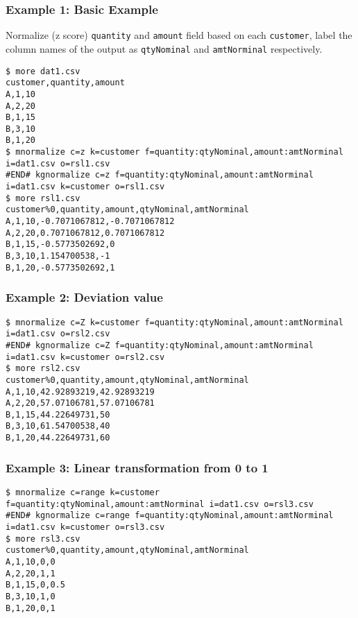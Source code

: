 \subsubsection*{Example 1: Basic Example}

Normalize (z score) \verb|quantity| and \verb|amount| field based on each \verb|customer|, label the column names of the output as \verb|qtyNominal| and \verb|amtNorminal| respectively.


\begin{Verbatim}[baselinestretch=0.7,frame=single]
$ more dat1.csv
customer,quantity,amount
A,1,10
A,2,20
B,1,15
B,3,10
B,1,20
$ mnormalize c=z k=customer f=quantity:qtyNominal,amount:amtNorminal i=dat1.csv o=rsl1.csv
#END# kgnormalize c=z f=quantity:qtyNominal,amount:amtNorminal i=dat1.csv k=customer o=rsl1.csv
$ more rsl1.csv
customer%0,quantity,amount,qtyNominal,amtNorminal
A,1,10,-0.7071067812,-0.7071067812
A,2,20,0.7071067812,0.7071067812
B,1,15,-0.5773502692,0
B,3,10,1.154700538,-1
B,1,20,-0.5773502692,1
\end{Verbatim}
\subsubsection*{Example 2: Deviation value}



\begin{Verbatim}[baselinestretch=0.7,frame=single]
$ mnormalize c=Z k=customer f=quantity:qtyNominal,amount:amtNorminal i=dat1.csv o=rsl2.csv
#END# kgnormalize c=Z f=quantity:qtyNominal,amount:amtNorminal i=dat1.csv k=customer o=rsl2.csv
$ more rsl2.csv
customer%0,quantity,amount,qtyNominal,amtNorminal
A,1,10,42.92893219,42.92893219
A,2,20,57.07106781,57.07106781
B,1,15,44.22649731,50
B,3,10,61.54700538,40
B,1,20,44.22649731,60
\end{Verbatim}
\subsubsection*{Example 3: Linear transformation from 0 to 1}



\begin{Verbatim}[baselinestretch=0.7,frame=single]
$ mnormalize c=range k=customer f=quantity:qtyNominal,amount:amtNorminal i=dat1.csv o=rsl3.csv
#END# kgnormalize c=range f=quantity:qtyNominal,amount:amtNorminal i=dat1.csv k=customer o=rsl3.csv
$ more rsl3.csv
customer%0,quantity,amount,qtyNominal,amtNorminal
A,1,10,0,0
A,2,20,1,1
B,1,15,0,0.5
B,3,10,1,0
B,1,20,0,1
\end{Verbatim}

